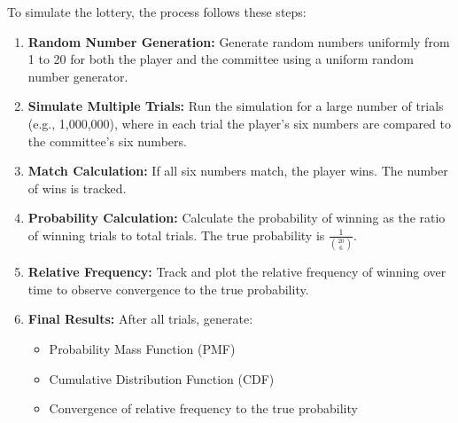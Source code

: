 \documentclass[journal]{IEEEtran}
\numberwithin{equation}{enumi}
\numberwithin{figure}{enumi}
\begin{document}
To simulate the lottery, the process follows these steps:

\begin{enumerate}
    \item \textbf{Random Number Generation:} Generate random numbers uniformly from 1 to 20 for both the player and the committee using a uniform random number generator.
    
    \item \textbf{Simulate Multiple Trials:} Run the simulation for a large number of trials (e.g., 1,000,000), where in each trial the player's six numbers are compared to the committee's six numbers.
    
    \item \textbf{Match Calculation:} If all six numbers match, the player wins. The number of wins is tracked.
    \item \textbf{Probability Calculation:} Calculate the probability of winning as the ratio of winning trials to total trials. The true probability is \( \frac{1}{\binom{20}{6}} \).

    \item \textbf{Relative Frequency:} Track and plot the relative frequency of winning over time to observe convergence to the true probability.

    \item \textbf{Final Results:} After all trials, generate:
    \begin{itemize}
        \item Probability Mass Function (PMF)
        \item Cumulative Distribution Function (CDF)
        \item Convergence of relative frequency to the true probability
    \end{itemize}
\end{enumerate}
\end{document}
